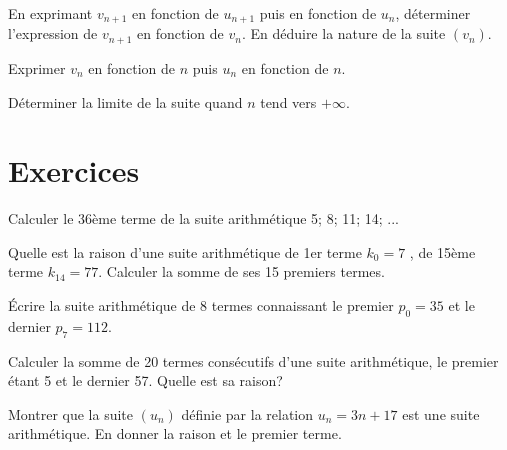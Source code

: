\documentclass[a4paper,12pt]{scrartcl}
\begin{document}
En exprimant $v_{n+1}$ en fonction de $u_{n+1}$ puis en fonction de $u_{n}$, déterminer l'expression de $v_{n+1}$ en fonction de $v_{n}$. En déduire la nature de la suite $(v_n)$.


Exprimer $v_n$ en fonction de $n$ puis $u_n$ en fonction de $n$.


Déterminer la limite de la suite quand $n$ tend vers $+\infty$. 

% 
% 
% 
% 



\section*{Exercices}


\question{}
Calculer le 36ème terme de la suite arithmétique 5; 8; 11; 14; ...

\question{}
Quelle est la raison d'une suite arithmétique de 1er terme $k_0 =7$ , de 15ème terme $k_{14} = 77$. Calculer la somme de ses 15 premiers termes.

\question{}
Écrire la suite arithmétique de 8 termes connaissant le premier $p_0 = 35$ et le dernier $p_7 = 112$. 

\question{}
Calculer la somme de 20 termes consécutifs d'une suite arithmétique, le premier étant 5 et le dernier 57. Quelle est sa raison?

\question{}
Montrer que la suite $(u_n)$ définie par la relation $u_n = 3n+17$ est une suite arithmétique. En donner la raison et le premier terme.
\end{document}
